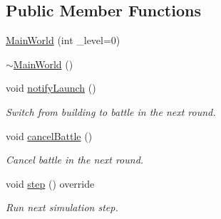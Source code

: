 \subsection*{Public Member Functions}
\begin{DoxyCompactItemize}
\item 
\hyperlink{classMainWorld_a46e56e826f563bf0255ad7e44944d286}{Main\+World} (int \+\_\+level=0)
\item 
\hyperlink{classMainWorld_ace9d329c017b003879831dcd8295cfe0}{$\sim$\+Main\+World} ()
\item 
void \hyperlink{classMainWorld_a7b7a15580a43911c7252d179b320bddd}{notify\+Launch} ()
\begin{DoxyCompactList}\small\item\em Switch from building to battle in the next round. \end{DoxyCompactList}\item 
void \hyperlink{classMainWorld_a223280718d44259c485fbbaaf74c34e5}{cancel\+Battle} ()
\begin{DoxyCompactList}\small\item\em Cancel battle in the next round. \end{DoxyCompactList}\item 
void \hyperlink{classMainWorld_a8ac7fe4b17bb3ca29a0382b93a24731e}{step} () override
\begin{DoxyCompactList}\small\item\em Run next simulation step. \end{DoxyCompactList}\end{DoxyCompactItemize}
